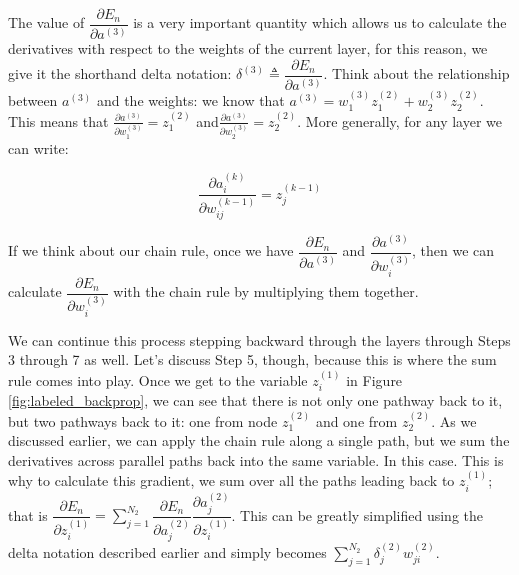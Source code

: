 \documentclass{article}
\begin{document}
The value of $\dfrac{\partial E_n}{\partial a^{(3)}}$ is a very important quantity which allows us to calculate the derivatives with respect to the weights of the current layer, for this reason, we give it the shorthand delta notation: $\delta^{(3)} \triangleq \dfrac{\partial E_n}{\partial a^{(3)}}$. Think about the relationship between $a^{(3)}$ and the weights: we know that $a^{(3)} = w_1^{(3)} z_1^{(2)} + w_2^{(3)} z_2^{(2)}$. This means that $\frac{\partial a^{(3)}}{\partial w_1^{(3)}} = z_1^{(2)}$ and$\frac{\partial a^{(3)}}{\partial w_2^{(3)}} = z_2^{(2)}$. More generally, for any layer we can write:

\begin{equation}
    \dfrac{\partial a_i^{(k)}}{\partial w_{ij}^{(k-1)}} = z_j^{(k-1)}
    \label{eq:dadw}
\end{equation}

If we think about our chain rule, once we have $\dfrac{\partial E_n}{\partial a^{(3)}}$ and $\dfrac{\partial a^{(3)}}{\partial w_i^{(3)}}$, then we can calculate $\dfrac{\partial E_n}{\partial w_i^{(3)}}$ with the chain rule by multiplying them together.

We can continue this process stepping backward through the layers through Steps 3 through 7 as well. Let's discuss Step 5, though, because this is where the sum rule comes into play. Once we get to the variable $z_i^{(1)}$ in Figure \ref{fig:labeled_backprop}, we can see that there is not only one pathway back to it, but two pathways back to it: one from node $z_1^{(2)}$ and one from $z_2^{(2)}$. As we discussed earlier, we can apply the chain rule along a single path, but we sum the derivatives across parallel paths back into the same variable. In this case. This is why to calculate this gradient, we sum over all the paths leading back to $z_i^{(1)}$; that is $\dfrac{\partial E_n}{\partial z_i^{(1)}} = \sum\limits_{j=1}^{N_2}\dfrac{\partial E_n}{\partial a_j^{(2)}} \dfrac{\partial a_j^{(2)}}{\partial z_i^{(1)}}$. This can be greatly simplified using the delta notation described earlier and simply becomes $\sum\limits_{j=1}^{N_2} \delta_j^{(2)} w_{ji}^{(2)}$.
\end{document}
